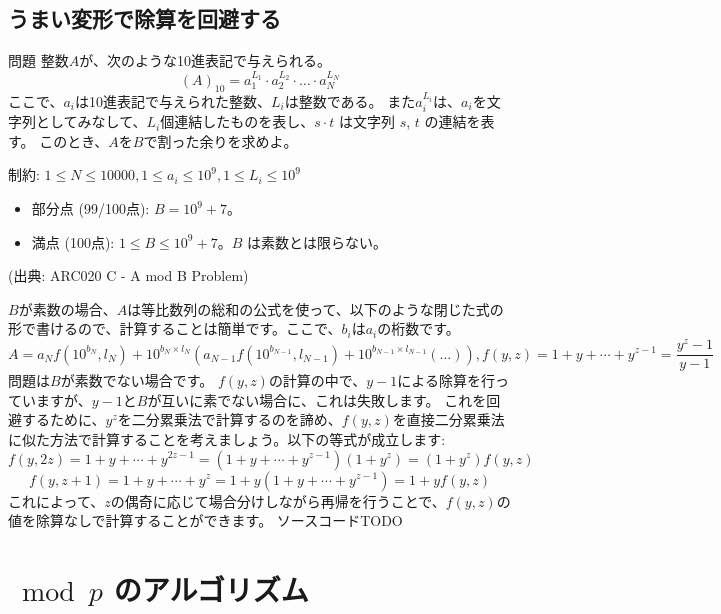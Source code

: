 \documentclass{jsarticle}
\begin{document}
  \subsection{うまい変形で除算を回避する}
  \label{subsec:avoiding-division}
  \begin{itembox}[l]{問題}
   整数$A$が、次のような10進表記で与えられる。
   \begin{displaymath}
    (A)_{10} = a_1^{L_1} \cdot a_2^{L_2} \cdot \dots \cdot a_N^{L_N}
   \end{displaymath}
   ここで、$a_i$は10進表記で与えられた整数、$L_i$は整数である。
   また$a_i^{L_i}$は、$a_i$を文字列としてみなして、$L_i$個連結したものを表し、$s \cdot t$ は文字列 $s$, $t$ の連結を表す。
   このとき、$A$を$B$で割った余りを求めよ。

   制約: $1 \le N \le 10000, 1\le a_i \le 10^9, 1 \le L_i \le 10^9$
   \begin{itemize}
    \item 部分点 (99/100点): $B = 10^9+7$。
    \item 満点 (100点): $1 \le B \le 10^9 + 7$。$B$ は素数とは限らない。
   \end{itemize}

   (出典: ARC020 C - A mod B Problem)
  \end{itembox}
  $B$が素数の場合、$A$は等比数列の総和の公式を使って、以下のような閉じた式の形で書けるので、計算することは簡単です。ここで、$b_i$は$a_i$の桁数です。
  \begin{displaymath}
   A = a_N f(10^{b_N},l_N)+10^{b_N \times l_N}(a_{N-1}f(10^{b_{N-1}},l_{N-1}) + 10^{b_{N-1} \times l_{N-1}} ( \ldots)),
   f(y,z) = 1+y+\cdots+y^{z-1} = \frac{y^z-1}{y-1}
  \end{displaymath}
  問題は$B$が素数でない場合です。
  $f(y,z)$の計算の中で、$y-1$による除算を行っていますが、$y-1$と$B$が互いに素でない場合に、これは失敗します。
  これを回避するために、$y^z$を二分累乗法で計算するのを諦め、$f(y,z)$を直接二分累乗法に似た方法で計算することを考えましょう。以下の等式が成立します:
  \begin{displaymath}
   f(y,2z) = 1+y+\cdots+y^{2z-1}=(1+y+\cdots+y^{z-1})(1+y^z)=(1+y^z)f(y,z)
  \end{displaymath}
  \begin{displaymath}
   f(y,z+1)=1+y+\cdots+y^{z}=1+y(1+y+\cdots+y^{z-1})=1+yf(y,z)
  \end{displaymath}
  これによって、$z$の偶奇に応じて場合分けしながら再帰を行うことで、$f(y,z)$の値を除算なしで計算することができます。
  ソースコードTODO
 \section{${}\bmod p$ のアルゴリズム}
\end{document}
